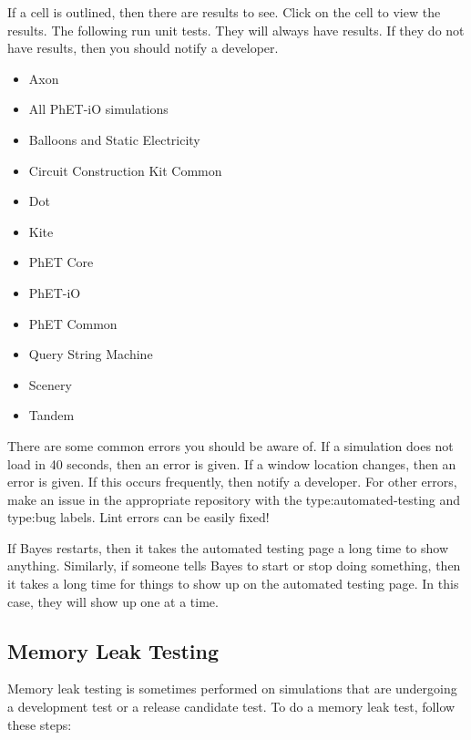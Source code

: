 \documentclass[titlepage]{article}
\begin{document}
If a cell is outlined, then there are results to see. Click on the cell to view the results. The following run unit tests. They will always have results. If they do not have results, then you should notify a developer.
		\begin{itemize}
			\item Axon
			\item All PhET-iO simulations
			\item Balloons and Static Electricity
			\item Circuit Construction Kit Common
			\item Dot
			\item Kite
			\item PhET Core
			\item PhET-iO
			\item PhET Common
			\item Query String Machine
			\item Scenery
			\item Tandem
		\end{itemize}

There are some common errors you should be aware of. If a simulation does not load in 40 seconds, then an error is given. If a window location changes, then an error is given. If this occurs frequently, then notify a developer. For other errors, make an issue in the appropriate repository with the type:automated-testing and type:bug labels. Lint errors can be easily fixed!

If Bayes restarts, then it takes the automated testing page a long time to show anything. Similarly, if someone tells Bayes to start or stop doing something, then it takes a long time for things to show up on the automated testing page. In this case, they will show up one at a time.

	\subsection{Memory Leak Testing}

Memory leak testing is sometimes performed on simulations that are undergoing a development test or a release candidate test. To do a memory leak test, follow these steps:
\end{document}
